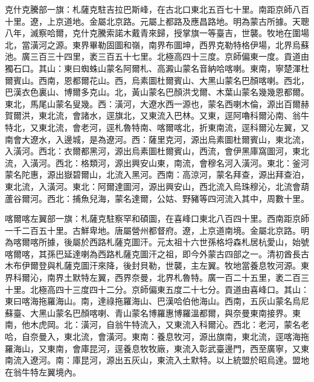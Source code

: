 \begin{pinyinscope}
克什克騰部一旗：札薩克駐吉拉巴斯峰，在古北口東北五百七十里。南距京師八百十里。遼，上京道地。金屬北京路。元屬上都路及應昌路地。明為蒙古所據。天聰八年，滅察哈爾，克什克騰索諾木戴青來歸，授掌旗一等臺吉，世襲。牧地在圍場北，當潢河之源。東界畢勒固圖和嶺，南界布圖坤，西界克勒特格伊場，北界烏蘇池。廣三百三十四里，袤三百五十七里。北極高四十三度。京師偏東一度。貢道由獨石口。其山：東曰蜘蛛山蒙名阿爾札、高澱山蒙名音納哈喀喇。東南，寧楚渾杜爾賓山。西南，恩都爾花山。西，烏素圖杜爾賓山、大黑山蒙名巴顏喀喇。西北，巴漢衣色裏山、博爾多克山。北，黃山蒙名巴顏洪戈爾、木葉山蒙名幾幾恩都爾。東北，馬尾山蒙名叟幾。西：潢河，大遼水西一源也，蒙名西喇木倫，源出百爾赫賀爾洪，東北流，會諸水，逕旗北，又東流入巴林。又東，逕阿嚕科爾沁南、翁牛特北，又東北流，會老河，逕札魯特南、喀爾喀北，折東南流，逕科爾沁左翼，又南會大遼水，入邊城，是為遼河。西：薩里克河，源出烏素圖杜爾賓山，東北流，入潢河。西北：衣爾都黑河，源出烏素圖杜爾賓山，西流，會伊黑庫窩圖河，東北流，入潢河。西北：格類河，源出興安山東，南流，會穆名河入潢河。東北：釜河蒙名陀惠，源出嶽碧爾山，北流入黑河。西南：高涼河，蒙名拜查，源出拜查泊，東北流，入潢河。東北：阿爾達圖河，源出興安山，西北流入烏珠穆沁，北流會葫蘆谷爾河。西北：捕魚兒海，蒙名達爾，公姑、野豬等四河流入其中，周數十里。

喀爾喀左翼部一旗：札薩克駐察罕和碩圖，在喜峰口東北八百四十里。西南距京師一千二百五十里。古鮮卑地。唐屬營州都督府。遼，上京道南境。金屬北京路。明為喀爾喀所據，後屬於西路札薩克圖汗。元太祖十六世孫格埒森札居杭愛山，始號喀爾喀，其孫巴延達喇為西路札薩克圖汗之祖，即今外蒙古四部之一。清初酋長古木布伊爾登與札薩克圖汗來降，後封貝勒，世襲，主左翼。牧地當養息牧河源。東界科爾沁，南界土默特左翼，西界奈曼，北界札魯特。廣一百二十五里，袤二百三十里。北極高四十三度四十二分。京師偏東五度二十七分。貢道由喜峰口。其山：東曰喀海拖羅海山。南，達祿拖羅海山、巴漢哈伯他海山。西南，五灰山蒙名烏尼蘇臺、大黑山蒙名巴顏喀喇、青山蒙名博羅惠博羅溫都爾，與奈曼東南接界。東南，他木虎岡。北：潢河，自翁牛特流入，又東流入科爾沁。西北：老河，蒙名老哈，自奈曼入，東北流，會潢河。東南：養息牧河，源出旗南，東北流，逕喀海拖羅海山，又東南，會庫昆河，逕養息牧牧廠，東流入彰武臺邊門，西至廣寧，又東南流入遼河。南：庫昆河，源出五灰山，東流入土默特。以上統盟於昭烏達。盟地在翁牛特左翼境內。


\end{pinyinscope}
